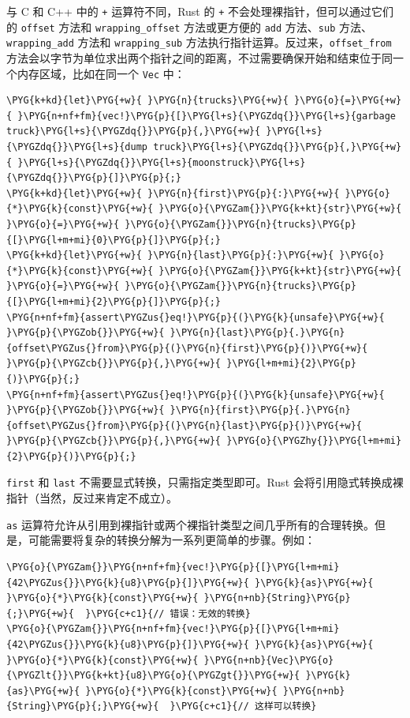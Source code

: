 与 C 和 C++ 中的 \texttt{+} 运算符不同，Rust 的 \texttt{+} 不会处理裸指针，但可以通过它们的 \texttt{offset} 方法和 \texttt{wrapping\_offset} 方法或更方便的 \texttt{add} 方法、\texttt{sub} 方法、\texttt{wrapping\_add} 方法和 \texttt{wrapping\_sub} 方法执行指针运算。反过来，\texttt{offset\_from} 方法会以字节为单位求出两个指针之间的距离，不过需要确保开始和结束位于同一个内存区域，比如在同一个 \texttt{Vec} 中：

\begin{Verbatim}[commandchars=\\\{\},breaklines=true,breakanywhere=true,fontsize=\codefont,xleftmargin=17bp]
\PYG{k+kd}{let}\PYG{+w}{ }\PYG{n}{trucks}\PYG{+w}{ }\PYG{o}{=}\PYG{+w}{ }\PYG{n+nf+fm}{vec!}\PYG{p}{[}\PYG{l+s}{\PYGZdq{}}\PYG{l+s}{garbage truck}\PYG{l+s}{\PYGZdq{}}\PYG{p}{,}\PYG{+w}{ }\PYG{l+s}{\PYGZdq{}}\PYG{l+s}{dump truck}\PYG{l+s}{\PYGZdq{}}\PYG{p}{,}\PYG{+w}{ }\PYG{l+s}{\PYGZdq{}}\PYG{l+s}{moonstruck}\PYG{l+s}{\PYGZdq{}}\PYG{p}{]}\PYG{p}{;}
\PYG{k+kd}{let}\PYG{+w}{ }\PYG{n}{first}\PYG{p}{:}\PYG{+w}{ }\PYG{o}{*}\PYG{k}{const}\PYG{+w}{ }\PYG{o}{\PYGZam{}}\PYG{k+kt}{str}\PYG{+w}{ }\PYG{o}{=}\PYG{+w}{ }\PYG{o}{\PYGZam{}}\PYG{n}{trucks}\PYG{p}{[}\PYG{l+m+mi}{0}\PYG{p}{]}\PYG{p}{;}
\PYG{k+kd}{let}\PYG{+w}{ }\PYG{n}{last}\PYG{p}{:}\PYG{+w}{ }\PYG{o}{*}\PYG{k}{const}\PYG{+w}{ }\PYG{o}{\PYGZam{}}\PYG{k+kt}{str}\PYG{+w}{ }\PYG{o}{=}\PYG{+w}{ }\PYG{o}{\PYGZam{}}\PYG{n}{trucks}\PYG{p}{[}\PYG{l+m+mi}{2}\PYG{p}{]}\PYG{p}{;}
\PYG{n+nf+fm}{assert\PYGZus{}eq!}\PYG{p}{(}\PYG{k}{unsafe}\PYG{+w}{ }\PYG{p}{\PYGZob{}}\PYG{+w}{ }\PYG{n}{last}\PYG{p}{.}\PYG{n}{offset\PYGZus{}from}\PYG{p}{(}\PYG{n}{first}\PYG{p}{)}\PYG{+w}{ }\PYG{p}{\PYGZcb{}}\PYG{p}{,}\PYG{+w}{ }\PYG{l+m+mi}{2}\PYG{p}{)}\PYG{p}{;}
\PYG{n+nf+fm}{assert\PYGZus{}eq!}\PYG{p}{(}\PYG{k}{unsafe}\PYG{+w}{ }\PYG{p}{\PYGZob{}}\PYG{+w}{ }\PYG{n}{first}\PYG{p}{.}\PYG{n}{offset\PYGZus{}from}\PYG{p}{(}\PYG{n}{last}\PYG{p}{)}\PYG{+w}{ }\PYG{p}{\PYGZcb{}}\PYG{p}{,}\PYG{+w}{ }\PYG{o}{\PYGZhy{}}\PYG{l+m+mi}{2}\PYG{p}{)}\PYG{p}{;}
\end{Verbatim}

\texttt{first} 和 \texttt{last} 不需要显式转换，只需指定类型即可。Rust 会将引用隐式转换成裸指针（当然，反过来肯定不成立）。

\texttt{as} 运算符允许从引用到裸指针或两个裸指针类型之间几乎所有的合理转换。但是，可能需要将复杂的转换分解为一系列更简单的步骤。例如：

\begin{Verbatim}[commandchars=\\\{\},breaklines=true,breakanywhere=true,fontsize=\codefont,xleftmargin=17bp]
\PYG{o}{\PYGZam{}}\PYG{n+nf+fm}{vec!}\PYG{p}{[}\PYG{l+m+mi}{42\PYGZus{}}\PYG{k}{u8}\PYG{p}{]}\PYG{+w}{ }\PYG{k}{as}\PYG{+w}{ }\PYG{o}{*}\PYG{k}{const}\PYG{+w}{ }\PYG{n+nb}{String}\PYG{p}{;}\PYG{+w}{  }\PYG{c+c1}{// 错误：无效的转换}
\PYG{o}{\PYGZam{}}\PYG{n+nf+fm}{vec!}\PYG{p}{[}\PYG{l+m+mi}{42\PYGZus{}}\PYG{k}{u8}\PYG{p}{]}\PYG{+w}{ }\PYG{k}{as}\PYG{+w}{ }\PYG{o}{*}\PYG{k}{const}\PYG{+w}{ }\PYG{n+nb}{Vec}\PYG{o}{\PYGZlt{}}\PYG{k+kt}{u8}\PYG{o}{\PYGZgt{}}\PYG{+w}{ }\PYG{k}{as}\PYG{+w}{ }\PYG{o}{*}\PYG{k}{const}\PYG{+w}{ }\PYG{n+nb}{String}\PYG{p}{;}\PYG{+w}{  }\PYG{c+c1}{// 这样可以转换}
\end{Verbatim}

